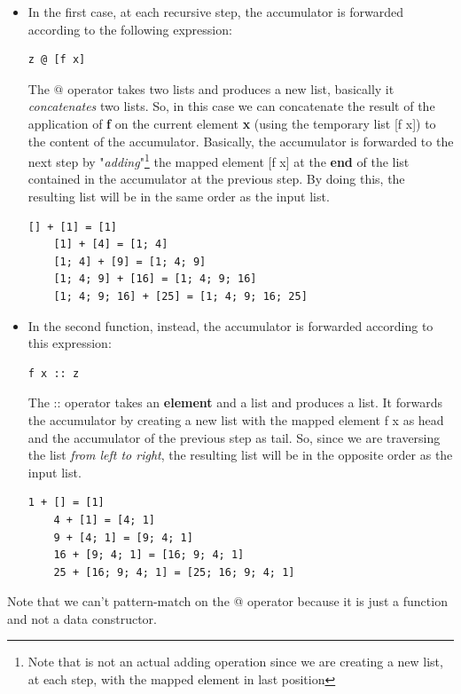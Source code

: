\begin{itemize}
    \item In the first case, at each recursive step, the accumulator is forwarded according to the following expression:
    \begin{lstlisting}[style = FSharpStyle]
    z @ [f x]
    \end{lstlisting}
    The $@$ operator takes two lists and produces a new list, basically it \textit{concatenates} two lists. So, in this case we can concatenate the result of the application of \textbf{f} on the current element \textbf{x} (using the temporary list [f x]) to the content of the accumulator. Basically, the accumulator is forwarded to the next step by "\textit{adding}"\footnote{Note that is not an actual adding operation since we are creating a new list, at each step, with the mapped element in last position} the mapped element [f x] at the \textbf{end} of the list contained in the accumulator at the previous step. By doing this, the resulting list will be in the same order as the input list.
    \begin{lstlisting}[style = FSharpStyle]
    [] + [1] = [1]
    [1] + [4] = [1; 4]
    [1; 4] + [9] = [1; 4; 9]
    [1; 4; 9] + [16] = [1; 4; 9; 16]
    [1; 4; 9; 16] + [25] = [1; 4; 9; 16; 25]
    \end{lstlisting}

    \item In the second function, instead, the accumulator is forwarded according to this expression:
    \begin{lstlisting}[style = FSharpStyle]
    f x :: z
    \end{lstlisting}
    The :: operator takes an \textbf{element} and a list and produces a list. It forwards the accumulator by creating a new list with the mapped element f x as head and the accumulator of the previous step as tail. So, since we are traversing the list \textit{from left to right}, the resulting list will be in the opposite order as the input list.
    \begin{lstlisting}[style = FSharpStyle]
    1 + [] = [1]
    4 + [1] = [4; 1]
    9 + [4; 1] = [9; 4; 1]
    16 + [9; 4; 1] = [16; 9; 4; 1]
    25 + [16; 9; 4; 1] = [25; 16; 9; 4; 1]
    \end{lstlisting}
    \end{itemize}
    Note that we can't pattern-match on the @ operator because it is just a function and not a data constructor.\newline\newline

